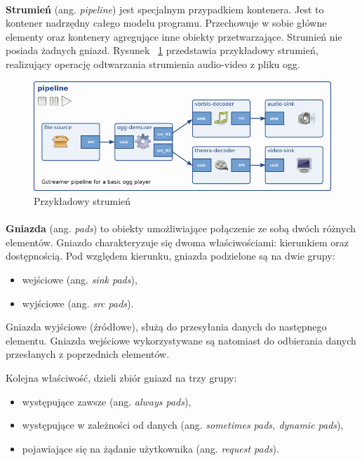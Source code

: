 \documentclass[12pt]{article}
\begin{document}
\paragraph{}
\textbf{Strumień} (ang. \textit{pipeline}) jest specjalnym przypadkiem kontenera. Jest to kontener nadrzędny całego modelu programu. Przechowuje w sobie główne elementy oraz kontenery agregujące inne obiekty przetwarzające. Strumień nie posiada żadnych gniazd. Rysunek ~\ref{fig:samplePipeline} przedstawia przykładowy strumień, realizujący operację odtwarzania strumienia audio-video z pliku ogg.
\begin{figure}[H]
  \includegraphics[width=150mm]{img/simple-player.png}
  \caption{Przykładowy strumień \cite{gstmainpage}}
  \label{fig:samplePipeline}
\end{figure}
\paragraph{}
\textbf{Gniazda} (ang. \textit{pads}) to obiekty umożliwiające połączenie ze sobą dwóch różnych elementów. Gniazdo charakteryzuje się dwoma właściwościami: kierunkiem oraz dostępnością. Pod względem kierunku, gniazda podzielone są na dwie grupy:
\begin{itemize}
 \setlength{\itemsep}{0em}
  \item wejściowe (ang. \textit{sink pads}),
  \item wyjściowe (ang. \textit{src pads}).
\end{itemize}

Gniazda wyjściowe (źródłowe), służą do przesyłania danych do następnego elementu. Gniazda wejściowe wykorzystywane są natomiast do odbierania danych przesłanych z poprzednich elementów.

Kolejna właściwość, dzieli zbiór gniazd na trzy grupy:
\begin{itemize}
 \setlength{\itemsep}{0em}
  \item występujące zawsze (ang. \textit{always pads}),
  \item występujące w zależności od danych (ang. \textit{sometimes pads, dynamic pads}),
  \item pojawiające się na żądanie użytkownika (ang. \textit{request pads}).
\end{itemize}
\end{document}
